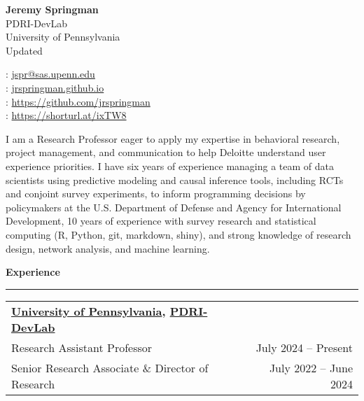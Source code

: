 \documentclass[11pt]{article}
\renewcommand{\today}{\monthname[\the\month] \the\year}
\begin{document}



\begin{multicols}{2}
{\Large {\bf Jeremy Springman}}\\
PDRI-DevLab\\
University of Pennsylvania\\
Updated \today \\

\columnbreak
\begin{flushright}

\faEnvelope: \href{mailto:jspr@sas.upenn.edu}{jspr@sas.upenn.edu}\\
\faLaptop: \url{jrspringman.github.io}\\
\faGithub: \url{https://github.com/jrspringman}\\
\aiGoogleScholar:  \url{https://shorturl.at/ixTW8}\\
\end{flushright}
\end{multicols}

I am a Research Professor eager to apply my expertise in behavioral research, project management, and communication to help Deloitte understand user experience priorities. I have six years of experience managing a team of data scientists using predictive modeling and causal inference tools, including RCTs and conjoint survey experiments, to inform programming decisions by policymakers at the U.S. Department of Defense and Agency for International Development, 10 years of experience with survey research and statistical computing (R, Python, git, markdown, shiny), and strong knowledge of research design, network analysis, and machine learning.

\textbf{\large Experience}\\
\rule[3mm]{\textwidth}{.2pt}
\noindent\begin{tabular*}{\textwidth}{@{}l@{\extracolsep{\fill}}r@{}}
\textbf{\href{https://www.polisci.upenn.edu/}{University of Pennsylvania}, \href{https://web.sas.upenn.edu/dev-lab/}{PDRI-DevLab}}\\
Research Assistant Professor & July 2024 -- Present\\
Senior Research Associate \& Director of Research & July 2022 -- June 2024\\
\end{tabular*}
\end{document}
